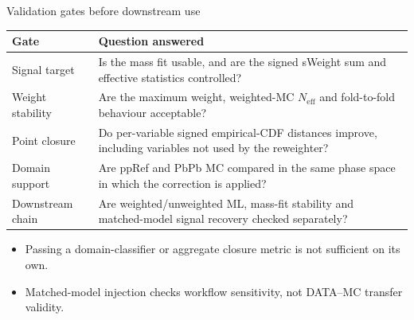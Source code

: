 \begin{frame}[label=p9]{Validation gates before downstream use}
  \small
  \renewcommand{\arraystretch}{1.20}
  \begin{tabular}{p{2.75cm}p{9.55cm}}
    \toprule
    Gate & Question answered \\
    \midrule
    Signal target
      & Is the mass fit usable, and are the signed sWeight sum and effective statistics controlled? \\
    Weight stability
      & Are the maximum weight, weighted-MC $N_{\mathrm{eff}}$ and fold-to-fold behaviour acceptable? \\
    Point closure
      & Do per-variable signed empirical-CDF distances improve, including variables not used by the reweighter? \\
    Domain support
      & Are ppRef and PbPb MC compared in the same phase space in which the correction is applied? \\
    Downstream chain
      & Are weighted/unweighted ML, mass-fit stability and matched-model signal recovery checked separately? \\
    \bottomrule
  \end{tabular}

  \vspace{0.7em}
  \begin{itemize}
    \setlength{\itemsep}{0.35em}
    \item Passing a domain-classifier or aggregate closure metric is not sufficient on its own.
    \item Matched-model injection checks workflow sensitivity, not DATA--MC transfer validity.
  \end{itemize}

\end{frame}
